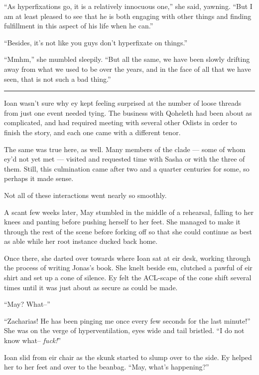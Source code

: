 ``As hyperfixations go, it is a relatively innocuous one,'' she said, yawning. ``But I am at least pleased to see that he is both engaging with other things and finding fulfillment in this aspect of his life when he can.''

``Besides, it's not like you guys don't hyperfixate on things.''

``Mmhm,'' she mumbled sleepily. ``But all the same, we have been slowly drifting away from what we used to be over the years, and in the face of all that we have seen, that is not such a bad thing.''

\begin{center}\rule{0.5\linewidth}{0.5pt}\end{center}

Ioan wasn't sure why ey kept feeling surprised at the number of loose threads from just one event needed tying. The business with Qoheleth had been about as complicated, and had required meeting with several other Odists in order to finish the story, and each one came with a different tenor.

The same was true here, as well. Many members of the clade — some of whom ey'd not yet met — visited and requested time with Sasha or with the three of them. Still, this culmination came after two and a quarter centuries for some, so perhaps it made sense.

Not all of these interactions went nearly so smoothly.

A scant few weeks later, May stumbled in the middle of a rehearsal, falling to her knees and panting before pushing herself to her feet. She managed to make it through the rest of the scene before forking off so that she could continue as best as able while her root instance ducked back home.

Once there, she darted over towards where Ioan sat at eir desk, working through the process of writing Jonas's book. She knelt beside em, clutched a pawful of eir shirt and set up a cone of silence. Ey felt the ACL-scape of the cone shift several times until it was just about as secure as could be made.

``May? What--''

``Zacharias! He has been pinging me once every few seconds for the last minute!'' She was on the verge of hyperventilation, eyes wide and tail bristled. ``I do not know what-- \emph{fuck!}''

Ioan slid from eir chair as the skunk started to slump over to the side. Ey helped her to her feet and over to the beanbag. ``May, what's happening?''

